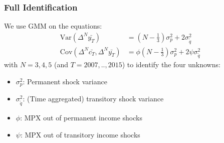 \documentclass{beamer}
\begin{document}
\frame
{
	\frametitle{Full Identification}
We use GMM on the equations:
\begin{align*}
\mathrm{Var}(\Delta^N \bar{y_T} ) &=  (N-\frac{1}{3}) \sigma^2_p + 2  \sigma^2_{\tilde{q}} \\
\mathrm{Cov}(\Delta^N \bar{c_T},\Delta^N \bar{y_T} ) &= \phi (N-\frac{1}{3}) \sigma^2_p + 2 \psi \sigma^2_{\tilde{q}}
\end{align*}
with $N=3,4,5$ (and $T=2007,..,2015$) to identify the four unknowns:
\begin{itemize}
	\item $\sigma^2_p$: Permanent shock variance
	\item $\sigma^2_{\tilde{q}}$: (Time aggregated) transitory shock variance
	\item $\phi$: MPX out of permanent income shocks
	\item $\psi$: MPX out of transitory income shocks
\end{itemize}
}
\end{document}

